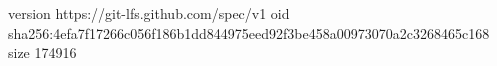 version https://git-lfs.github.com/spec/v1
oid sha256:4efa7f17266c056f186b1dd844975eed92f3be458a00973070a2c3268465c168
size 174916
